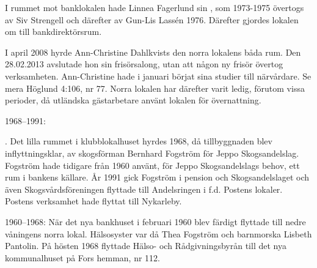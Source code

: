 I rummet mot banklokalen hade Linnea Fagerlund sin , som 1973-1975 övertogs av Siv Strengell och därefter av Gun-Lis Lassén 1976. Därefter gjordes lokalen om till bankdirektörsrum.

I april 2008 hyrde Ann-Christine Dahlkvists  den norra lokalens båda rum. Den 28.02.2013 avslutade hon sin frisörsalong, utan att någon ny frisör övertog verksamheten. Ann-Christine hade i januari börjat sina studier till närvårdare. Se mera Höglund 4:106, nr 77. Norra lokalen har därefter varit ledig, förutom vissa perioder, då utländska gästarbetare använt lokalen för övernattning.

1968--1991:

. Det lilla rummet i klubblokalhuset hyrdes 1968, då tillbyggnaden blev inflyttningsklar, av skogsförman Bernhard Fogström för Jeppo Skogsandelslag. Fogström hade tidigare från 1960 använt, för Jeppo Skogsandelslags behov, ett rum i bankens källare. År 1991 gick Fogström i pension och Skogsandelslaget och även Skogsvårdsföreningen flyttade till Andelsringen i f.d. Postens lokaler. Postens verksamhet hade flyttat till Nykarleby.

1960--1968:
När det nya bankhuset i februari 1960 blev färdigt flyttade  till nedre våningens norra lokal. Hälsosyster var då Thea Fogström och barnmorska Lisbeth Pantolin. På hösten 1968 flyttade Hälso- och Rådgivningsbyrån till det nya	kommunalhuset på Fors hemman, nr 112.




